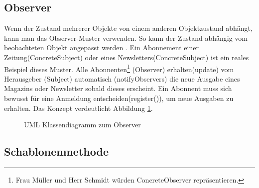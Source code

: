 \subsection{Observer}
Wenn der Zustand mehrerer Objekte von einem anderen Objektzustand abhängt, kann man das Observer-Muster verwenden. So kann der Zustand abhängig vom beobachteten Objekt angepasst werden \cite[4.7]{starke:swa}. Ein Abonnement einer Zeitung(ConcreteSubject) oder eines Newsletters(ConcreteSubject) ist ein reales Beispiel dieses Muster. Alle Abonnenten\footnote{Frau Müller und Herr Schmidt würden ConcreteObserver repräsentieren.} (Observer) erhalten(update) vom Herausgeber (Subject) automatisch (notifyObservers) die neue Ausgabe eines Magazins oder Newsletter sobald dieses erscheint. Ein Abonnent muss sich bewusst für eine Anmeldung entscheiden(register()), um neue Ausgaben zu erhalten. Das Konzept verdeutlicht Abbildung \ref{observer}.

\begin{figure}[htbp]
  \vspace{0.5cm}
  \centering
   \caption{UML Klassendiagramm zum Observer\cite[S. 71]{starke:swa}}
  \label{observer}
  \vspace{0.5cm}
\end{figure}

\FloatBarrier
\subsection{Schablonenmethode}

